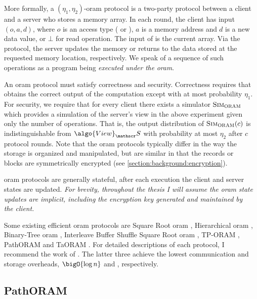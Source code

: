		More formally, a $(\eta_1, \eta_2)$-\acrshort{oram} protocol is a two-party protocol between a client \client{} and a server \server{} who stores a memory array.
		In each round, the client \client{} has input $(o, a, d)$, where $o$ is an access type (\oramRead{} or \oramWrite{}), $a$ is a memory address and $d$ is a new data value, or $\bot$ for read operation.
		The input of \server{} is the current array.
		Via the protocol, the server updates the memory or returns to \user{} the data stored at the requested memory location, respectively.
		We speak of a sequence of such operations as a program \oramProgram{} being \emph{executed under the \acrshort{oram}}.

		An \acrshort{oram} protocol must satisfy correctness and security.
		Correctness requires that \client{} obtains the correct output of the computation except with at most probability $\eta_1$.
		For security, we require that for every client \client{} there exists a simulator $\textsc{Sim}_{\textsc{ORAM}}$ which provides a simulation of the server's view in the above experiment given only the number of operations.
		That is, the output distribution of $\textsc{Sim}_{\textsc{ORAM}} (c)$ is indistinguishable from $\algo{View}_\server$ with probability at most $\eta_2$ after $c$ protocol rounds.
		Note that the \acrshort{oram} protocols typically differ in the way the storage is organized and manipulated, but are similar in that the records or blocks are symmetrically encrypted (see \cref{section:background:encryption}).

		\acrshort{oram} protocols are generally stateful, after each execution the client and server states are updated.
		\emph{For brevity, throughout the thesis I will assume the \acrshort{oram} state updates are implicit, including the encryption key generated and maintained by the client.}

		Some existing efficient \acrshort{oram} protocols are Square Root \acrshort{oram} \cite{oram-theory}, Hierarchical \acrshort{oram} \cite{oram-original}, Binary-Tree \acrshort{oram} \cite{binary-tree-oram}, Interleave Buffer Shuffle Square Root \acrshort{oram} \cite{shortest-path-oram}, TP-ORAM \cite{tp-oram}, PathORAM \cite{path-oram} and TaORAM \cite{taostore}.
		For detailed descriptions of each protocol, I recommend the work of \textcite{oram-survey-feifei}.
		The latter three  achieve the lowest communication and storage overheads, $\bigO{\log \dataSize}$ and \bigO{\dataSize}, respectively.

		\subsection{PathORAM}

